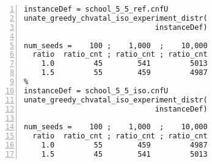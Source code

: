 \begin{table}[h!]
\vspace*{-1.1ex} 

\caption{
A statistical summary of results, based on  experiments that involve
100 isomorphs, initialized with 100 seeds, created from each of the two instances: 
{\tt school\_5\_5\_ref} and {\tt school\_5\_5\_iso}.
For the complete R-code of the stochastic greedy algorithm 
that relies on invoking any number of instance isomorphs, the algorithm
{\tt unate\_greedy\_chvatal\_iso} in
Figure~\ref{fg_bgmc_unate_greedy_chvatal_stoc}a.
However, identical results can also be generated,
using the same seeds,
with the alternative algorithm 
{\tt unate\_greedy\_chvatal\_stoc} in
Figure~\ref{fg_bgmc_unate_greedy_chvatal_stoc}b.
}
\hspace*{0.5em}
\vspace*{-1ex}
\begin{minipage}{0.40\textwidth}
\begin{Verbatim}[frame=lines, fontsize=\footnotesize,numbers=left,
numbersep=3pt,firstline=1,xleftmargin=9mm]
instanceDef = school_5_5_ref.cnfU 
unate_greedy_chvatal_iso_experiment_distr(
                              instanceDef)
                                                            
num_seeds =    100 ;    1,000  ;    10,000
  ratio  ratio_cnt ; ratio_cnt ; ratio_cnt
    1.0         45        541         5013
    1.5         55        459         4987
%
instanceDef = school_5_5_iso.cnfU 
unate_greedy_chvatal_iso_experiment_distr(
                              instanceDef)
                                                            
num_seeds =    100 ;    1,000  ;    10,000
  ratio  ratio_cnt ; ratio_cnt ; ratio_cnt
    1.0         55        459         4987
    1.5         45        541         5013
\end{Verbatim}
\end{minipage}

\label{tb_bgmc_unate_greedy_chvatal_school_5_5_iso}
\end{table}